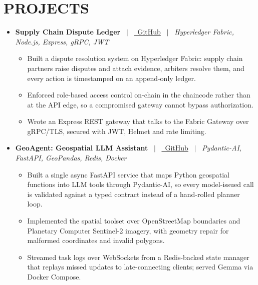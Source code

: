 \documentclass[11pt,a4paper]{article}
\newcommand{\resumeProjectHeading}[3]{%
    \item[]
    \noindent
    \textbf{#1} \ $|$ \ \href{#2}{\small\faGithub\ GitHub} \ $|$ \ \textit{\small #3}
    \par\vspace{0.8pt}
}
\newcommand{\resumeItem}[1]{%
    \item\small #1
}
\begin{document}
\section{PROJECTS}

\begin{itemize}[leftmargin=0pt]


\resumeProjectHeading
{Supply Chain Dispute Ledger}
{https://github.com/Krish3101/dispute-ledger}
{Hyperledger Fabric, Node.js, Express, gRPC, JWT}

\begin{itemize}

\resumeItem{
Built a dispute resolution system on Hyperledger Fabric: supply chain partners raise disputes and attach evidence, arbiters resolve them, and every action is timestamped on an append-only ledger.
}

\resumeItem{
Enforced role-based access control on-chain in the chaincode rather than at the API edge, so a compromised gateway cannot bypass authorization.
}

\resumeItem{
Wrote an Express REST gateway that talks to the Fabric Gateway over gRPC/TLS, secured with JWT, Helmet and rate limiting.
}

\end{itemize}


\resumeProjectHeading
{GeoAgent: Geospatial LLM Assistant}
{https://github.com/Krish3101/geo-agents}
{Pydantic-AI, FastAPI, GeoPandas, Redis, Docker}

\begin{itemize}

\resumeItem{
Built a single async FastAPI service that maps Python geospatial functions into LLM tools through Pydantic-AI, so every model-issued call is validated against a typed contract instead of a hand-rolled planner loop.
}

\resumeItem{
Implemented the spatial toolset over OpenStreetMap boundaries and Planetary Computer Sentinel-2 imagery, with geometry repair for malformed coordinates and invalid polygons.
}

\resumeItem{
Streamed task logs over WebSockets from a Redis-backed state manager that replays missed updates to late-connecting clients; served Gemma via Docker Compose.
}


\end{itemize}
\end{itemize}
\end{document}
